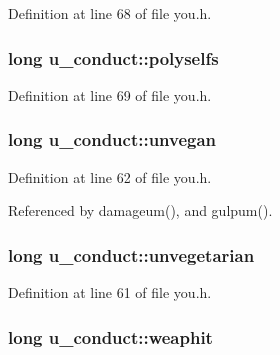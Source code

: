 Definition at line 68 of file you.\+h.

\hypertarget{structu__conduct_a50d1cae6a56126251070944e2d3ec3ff}{
\subsubsection[{polyselfs}]{\setlength{\rightskip}{0pt plus 5cm}long u\+\_\+conduct\+::polyselfs}}\label{structu__conduct_a50d1cae6a56126251070944e2d3ec3ff}


Definition at line 69 of file you.\+h.

\hypertarget{structu__conduct_a3f98bca389fa71f4dabbd75829719dbf}{
\subsubsection[{unvegan}]{\setlength{\rightskip}{0pt plus 5cm}long u\+\_\+conduct\+::unvegan}}\label{structu__conduct_a3f98bca389fa71f4dabbd75829719dbf}


Definition at line 62 of file you.\+h.



Referenced by damageum(), and gulpum().

\hypertarget{structu__conduct_af43373262632e43fc206cb7ee97e1720}{
\subsubsection[{unvegetarian}]{\setlength{\rightskip}{0pt plus 5cm}long u\+\_\+conduct\+::unvegetarian}}\label{structu__conduct_af43373262632e43fc206cb7ee97e1720}


Definition at line 61 of file you.\+h.

\hypertarget{structu__conduct_a5faa37ddcce277ff9f9d27de1132673b}{
\subsubsection[{weaphit}]{\setlength{\rightskip}{0pt plus 5cm}long u\+\_\+conduct\+::weaphit}}\label{structu__conduct_a5faa37ddcce277ff9f9d27de1132673b}


